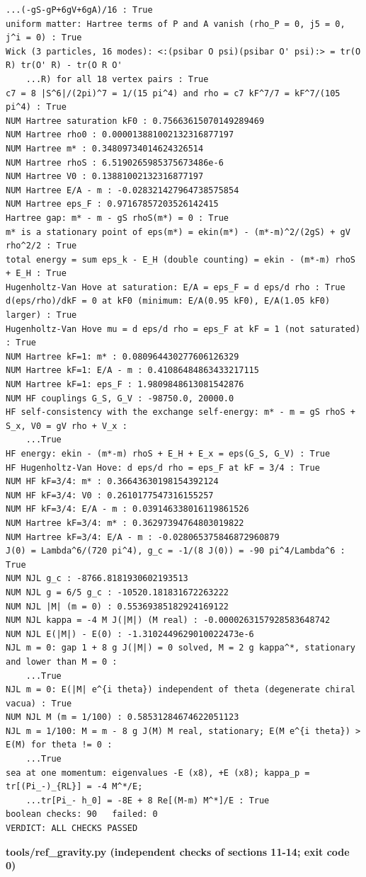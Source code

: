\documentclass[10pt,a4paper]{article}
\begin{document}
\begin{Verbatim}[fontsize=\small,frame=single,framesep=2mm]
    ...(-gS-gP+6gV+6gA)/16 : True
uniform matter: Hartree terms of P and A vanish (rho_P = 0, j5 = 0, j^i = 0) : True
Wick (3 particles, 16 modes): <:(psibar O psi)(psibar O' psi):> = tr(O R) tr(O' R) - tr(O R O'
    ...R) for all 18 vertex pairs : True
c7 = 8 |S^6|/(2pi)^7 = 1/(15 pi^4) and rho = c7 kF^7/7 = kF^7/(105 pi^4) : True
NUM Hartree saturation kF0 : 0.75663615070149289469
NUM Hartree rho0 : 0.000013881002132316877197
NUM Hartree m* : 0.34809734014624326514
NUM Hartree rhoS : 6.5190265985375673486e-6
NUM Hartree V0 : 0.13881002132316877197
NUM Hartree E/A - m : -0.028321427964738575854
NUM Hartree eps_F : 0.97167857203526142415
Hartree gap: m* - m - gS rhoS(m*) = 0 : True
m* is a stationary point of eps(m*) = ekin(m*) - (m*-m)^2/(2gS) + gV rho^2/2 : True
total energy = sum eps_k - E_H (double counting) = ekin - (m*-m) rhoS + E_H : True
Hugenholtz-Van Hove at saturation: E/A = eps_F = d eps/d rho : True
d(eps/rho)/dkF = 0 at kF0 (minimum: E/A(0.95 kF0), E/A(1.05 kF0) larger) : True
Hugenholtz-Van Hove mu = d eps/d rho = eps_F at kF = 1 (not saturated) : True
NUM Hartree kF=1: m* : 0.080964430277606126329
NUM Hartree kF=1: E/A - m : 0.41086484863433217115
NUM Hartree kF=1: eps_F : 1.9809848613081542876
NUM HF couplings G_S, G_V : -98750.0, 20000.0
HF self-consistency with the exchange self-energy: m* - m = gS rhoS + S_x, V0 = gV rho + V_x :
    ...True
HF energy: ekin - (m*-m) rhoS + E_H + E_x = eps(G_S, G_V) : True
HF Hugenholtz-Van Hove: d eps/d rho = eps_F at kF = 3/4 : True
NUM HF kF=3/4: m* : 0.36643630198154392124
NUM HF kF=3/4: V0 : 0.2610177547316155257
NUM HF kF=3/4: E/A - m : 0.039146338016119861526
NUM Hartree kF=3/4: m* : 0.36297394764803019822
NUM Hartree kF=3/4: E/A - m : -0.028065375846872960879
J(0) = Lambda^6/(720 pi^4), g_c = -1/(8 J(0)) = -90 pi^4/Lambda^6 : True
NUM NJL g_c : -8766.8181930602193513
NUM NJL g = 6/5 g_c : -10520.181831672263222
NUM NJL |M| (m = 0) : 0.55369385182924169122
NUM NJL kappa = -4 M J(|M|) (M real) : -0.0000263157928583648742
NUM NJL E(|M|) - E(0) : -1.3102449629010022473e-6
NJL m = 0: gap 1 + 8 g J(|M|) = 0 solved, M = 2 g kappa^*, stationary and lower than M = 0 :
    ...True
NJL m = 0: E(|M| e^{i theta}) independent of theta (degenerate chiral vacua) : True
NUM NJL M (m = 1/100) : 0.58531284674622051123
NJL m = 1/100: M = m - 8 g J(M) M real, stationary; E(M e^{i theta}) > E(M) for theta != 0 :
    ...True
sea at one momentum: eigenvalues -E (x8), +E (x8); kappa_p = tr[(Pi_-)_{RL}] = -4 M^*/E;
    ...tr[Pi_- h_0] = -8E + 8 Re[(M-m) M^*]/E : True
boolean checks: 90   failed: 0
VERDICT: ALL CHECKS PASSED
\end{Verbatim}
\textbf{tools/ref\_gravity.py (independent checks of sections 11-14; exit code 0)}
\end{document}
